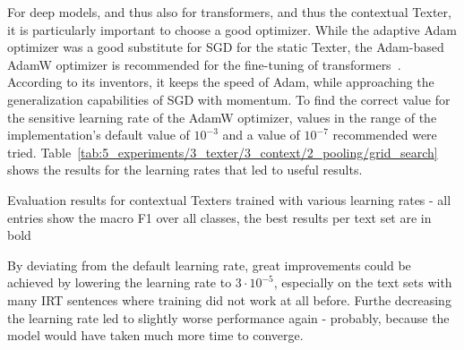 For deep models, and thus also for transformers, and thus the contextual Texter, it is particularly important to choose a good optimizer. While the adaptive Adam optimizer was a good substitute for SGD for the static Texter, the Adam-based AdamW optimizer is recommended for the fine-tuning of transformers~\cite{Loshchilov2019DecoupledWD}. According to its inventors, it keeps the speed of Adam, while approaching the generalization capabilities of SGD with momentum. To find the correct value for the sensitive learning rate of the AdamW optimizer, values in the range of the implementation's default value of $10^{-3}$ and a value of $10^{-7}$ recommended were tried. Table~\ref{tab:5_experiments/3_texter/3_context/2_pooling/grid_search} shows the results for the learning rates that led to useful results.

\begin{table}[h]
    \centering
    
    \caption{Evaluation results for contextual Texters trained with various learning rates - all entries show the macro F1 over all classes, the best results per text set are in bold}
    \label{tab:5_experiments/3_texter/3_context/3_optimizer/grid_search}
\end{table}

By deviating from the default learning rate, great improvements could be achieved by lowering the learning rate to $3 \cdot 10^{-5}$, especially on the text sets with many IRT sentences where training did not work at all before. Furthe decreasing the learning rate led to slightly worse performance again - probably, because the model would have taken much more time to converge.
